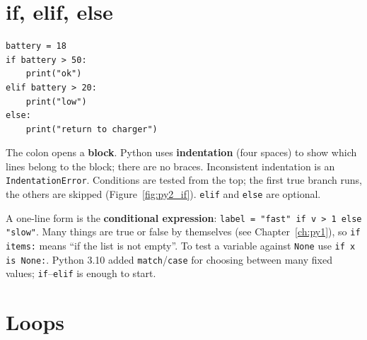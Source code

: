 \section*{if, elif, else}
\begin{verbatim}
battery = 18
if battery > 50:
    print("ok")
elif battery > 20:
    print("low")
else:
    print("return to charger")
\end{verbatim}
The colon opens a \textbf{block}. Python uses \textbf{indentation} (four spaces) to show which lines belong to the block; there are no braces. Inconsistent indentation is an \texttt{IndentationError}. Conditions are tested from the top; the first true branch runs, the others are skipped (Figure~\ref{fig:py2_if}). \texttt{elif} and \texttt{else} are optional.
\begin{center}
\label{fig:py2_if}
\end{center}
A one-line form is the \textbf{conditional expression}: \verb!label = "fast" if v > 1 else "slow"!. Many things are true or false by themselves (see Chapter~\ref{ch:py1}), so \verb!if items:! means ``if the list is not empty''. To test a variable against \texttt{None} use \verb!if x is None:!. Python 3.10 added \texttt{match}/\texttt{case} for choosing between many fixed values; \texttt{if}--\texttt{elif} is enough to start.

\section*{Loops}
